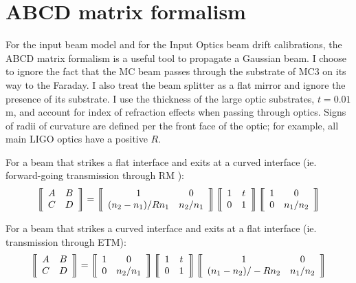 \section{ABCD matrix formalism}
For the input beam model and for the Input Optics beam drift
calibrations, the ABCD matrix formalism is a useful tool to propagate
a Gaussian beam. I choose to ignore the fact that the MC beam passes
through the substrate of MC3 on its way to the Faraday. I also treat
the beam splitter as a flat mirror and ignore the presence of its
substrate. I use the thickness of the large optic substrates, $t=0.01$
m, and account for index of refraction effects when passing through
optics. Signs of radii of curvature are defined per the front face of
the optic; for example, all main LIGO optics have a positive $R$.

For a beam that strikes a flat interface and exits at a curved
interface (ie. forward-going transmission through RM ):
\begin{equation}
\left\llbracket \begin{array}{c c}
A & B \\
C & D \end{array} \right\rrbracket = 
\left\llbracket \begin{array}{c c}
1 & 0 \\
(n_2-n_1)/Rn_1 & n_2/n_1 \end{array} \right\rrbracket
\left\llbracket \begin{array}{c c}
1 & t \\
0 & 1 \end{array} \right\rrbracket
\left\llbracket \begin{array}{c c}
1 & 0 \\
0 & n_1/n_2 \end{array} \right\rrbracket
\end{equation}

For a beam that strikes a curved interface and exits at a flat
interface (ie. transmission through ETM):
\begin{equation}
\left\llbracket \begin{array}{c c}
A & B \\
C & D \end{array} \right\rrbracket = 
\left\llbracket \begin{array}{c c}
1 & 0 \\
0 & n_2/n_1 \end{array} \right\rrbracket
\left\llbracket \begin{array}{c c}
1 & t \\
0 & 1 \end{array} \right\rrbracket
\left\llbracket \begin{array}{c c}
1 & 0 \\
(n_1-n_2)/-Rn_2 & n_1/n_2 \end{array} \right\rrbracket
\end{equation}

